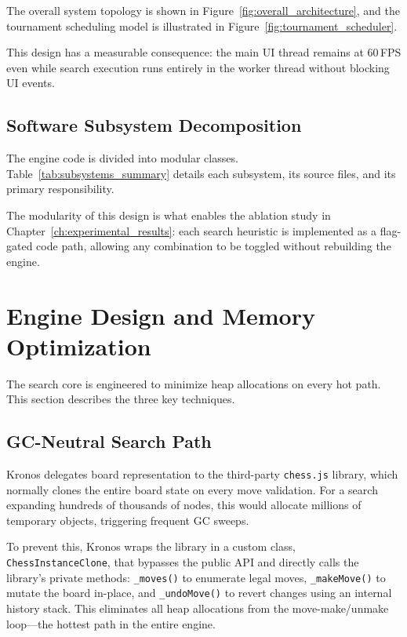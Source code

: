 The overall system topology is shown in Figure~\ref{fig:overall_architecture}, and the tournament scheduling model is illustrated in Figure~\ref{fig:tournament_scheduler}.




This design has a measurable consequence: the main UI thread remains at 60\,FPS even while search execution runs entirely in the worker thread without blocking UI events.

\subsection{Software Subsystem Decomposition}
The engine code is divided into modular classes. Table~\ref{tab:subsystems_summary} details each subsystem, its source files, and its primary responsibility.



The modularity of this design is what enables the ablation study in Chapter~\ref{ch:experimental_results}: each search heuristic is implemented as a flag-gated code path, allowing any combination to be toggled without rebuilding the engine.

\section{Engine Design and Memory Optimization}
The search core is engineered to minimize heap allocations on every hot path. This section describes the three key techniques.

\subsection{GC-Neutral Search Path}
Kronos delegates board representation to the third-party \texttt{chess.js} library, which normally clones the entire board state on every move validation. For a search expanding hundreds of thousands of nodes, this would allocate millions of temporary objects, triggering frequent GC sweeps.

To prevent this, Kronos wraps the library in a custom class, \texttt{ChessInstanceClone}, that bypasses the public API and directly calls the library's private methods: \texttt{\_moves()} to enumerate legal moves, \texttt{\_makeMove()} to mutate the board in-place, and \texttt{\_undoMove()} to revert changes using an internal history stack. This eliminates all heap allocations from the move-make/unmake loop—the hottest path in the entire engine.

